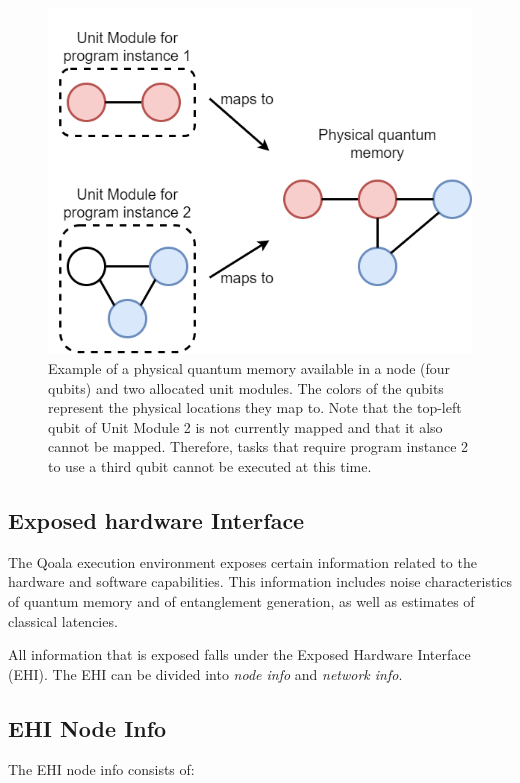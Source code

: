\begin{figure}[ht]
    \centering
    \includegraphics[scale=0.4]{figures/qoala/unit_module.png}
    \caption{Example of a physical quantum memory available in a node (four qubits) and two allocated unit modules. The colors of the qubits represent the physical locations they map to. Note that the top-left qubit of Unit Module 2 is not currently mapped and that it also cannot be mapped. Therefore, tasks that require program instance 2 to use a third qubit cannot be executed at this time.}
    \label{qoala:fig:app:unit_module}
\end{figure}



\subsection{Exposed hardware Interface}
\label{qoala:sec:app:ehi}
The Qoala execution environment exposes certain information related to the hardware and software capabilities.
This information includes noise characteristics of quantum memory and of entanglement generation, as well as estimates of classical latencies.

All information that is exposed falls under the Exposed Hardware Interface (EHI).
The EHI can be divided into \textit{node info} and \textit{network info}.


\subsection{EHI Node Info}
The EHI node info consists of:

